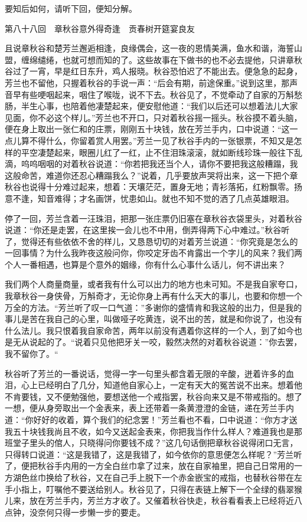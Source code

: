 \documentclass[12pt,UTF8]{ctexbook}
\begin{document}
{{{要知后如何，请听下回，便知分解。





第八十八回　章秋谷意外得奇逢　贡春树开筵宴良友





且说章秋谷和楚芳兰邂逅相逢，良缘偶会，这一夜的恩情美满，鱼水和谐，海誓山盟，缠绵缱绻，也就可想而知的了。这些故事在下做书的也不必去提他，只讲章秋谷过了一宵，早是红日东升，鸡人报晓。秋谷恐怕迟了不能出去。便急急的起身，芳兰也不留他，只握着秋谷的手说一声：“后会有期，前途保重。”说到这里，那声音早有些哽咽起来，咽住了喉咙，说不下去。秋谷见了，不觉牵动了自家的万斛愁肠，半生心事，也陪着他凄楚起来，便安慰他道：“我们以后还可以想着法儿大家见面，你不必这个样儿。”芳兰也不开口，只对着秋谷摇一摇头。秋谷摸不着头脑，便在身上取出一张仁和的庄票，刚刚五十块钱，放在芳兰手内，口中说道：“这一点儿算不得什么，你留着赏人用罢。”芳兰一见了秋谷手内的一张银票，不知又是怎样的平空凄楚起来，眼圈儿红了一红，止不住泪珠滚滚，就如断线珍珠一般往下乱滴，呜呜咽咽的对着秋谷说道：“你若把我还当个人，请你不要把我这般糟蹋，我这般命苦，难道你还忍心糟蹋我么？”说着，几乎要放声哭将出来，这一下把个章秋谷也说得十分难过起来，想着：天壤茫茫，置身无地；青衫落拓，红粉飘零。扬意不逢，知音难得；才名画饼，忧患如山。就也不知不觉的洒了几点英雄眼泪。

停了一回，芳兰含着一汪珠泪，把那一张庄票仍旧塞在章秋谷衣袋里头，对着秋谷说道：“你还是走罢，在这里挨一会儿也不中用，倒弄得两下心中难过。”秋谷听了，觉得还有些依依不舍的样儿，又恳恳切切的对着芳兰说道：“你究竟是怎么的一回事情？为什么我昨夜这般问你，你咬定牙齿不肯露出一个字儿的风来？我们两个人一番相遇，也算是个意外的姻缘，你有什么心事什么话儿，何不讲出来？

我们两个人商量商量，或者我有什么可以出力的地方也未可知。不是我自家夸口，我章秋谷一身侠骨，万斛奇才，无论你身上再有什么天大的事儿，也要和你想一个万全的方法。“芳兰听了叹一口气道：”多谢你的盛情肯和我这般的出力，但是我的事儿是苦在我自己的心里，叫做哑子吃黄连，说不出的苦，就是和你说了，也没有什么法儿。我只恨着我自家命苦，两年以前没有遇着你这样的一个人，到了如今也是无从说起的了。“说着只见他把牙关一咬，毅然决然的对着秋谷说道：”你去罢，我不留你了。“

秋谷听了芳兰的一番说话，觉得一字一句里头都含着无限的辛酸，迸着许多的血泪，心上已经明白了几分，知道他自家心上，一定有天大的冤苦说不出来。想着他不肯要钱，又不便勉强他，要想送他一个戒指罢，秋谷向来又是不带戒指的。想了一想，便从身旁取出一个金表来，表上还带着一条黄澄澄的金链，递在芳兰手内道：“你好好的收着，算个我们的纪念罢！”芳兰看也不看，口中说道：“你方才送我五十块钱我尚且不收，如今又送起金表来，你把我当作什么样人？难道我也是那班堂子里头的倌人，只晓得问你要钱不成？”这几句话倒把章秋谷说得闭口无言，只得转口说道：“这是我错了，这是我错了，如今依你的意思便怎么样呢？”芳兰听了，便把秋谷手内用的一方全白丝巾拿了过来，放在自家袖里，把自己日常用的一方湖色丝巾换给了秋谷，又在自己手上脱下一个赤金嵌宝的戒指，也替秋谷带在左手小指上，叮嘱他不要送给别人。秋谷见了，只得在表链上解下一个全绿的翡翠猴儿来，放在芳兰手内，芳兰方才收了。又催着秋谷快走，秋谷看看表上已经将近八点钟，没奈何只得一步懒一步的要走。

}}}
\end{document}
